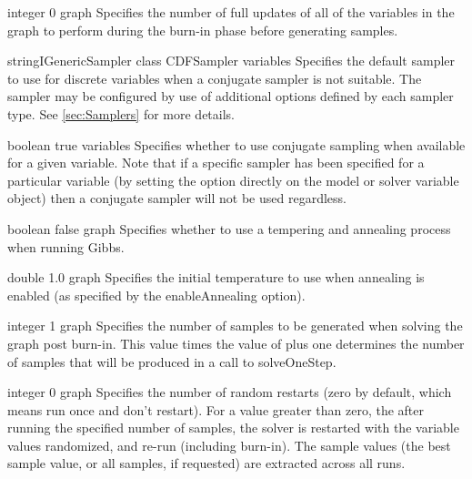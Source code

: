 
{integer}
{0}
{graph}
{Specifies the number of full updates of all of the variables in the graph to perform during the burn-in phase before generating samples.}


{\ifmatlab string\fi \ifjava IGenericSampler class\fi}
{CDFSampler}
{variables}
{Specifies the default sampler to use for discrete variables when a conjugate sampler is not  suitable. The sampler may be configured by use of additional options defined by each sampler type. See \autoref{sec:Samplers} for more details.}


{boolean}
{true}
{variables}
{Specifies whether to use conjugate sampling when available for a given variable. Note that if a specific sampler has been specified for a particular variable (by setting the  option directly on the model or solver variable object) then a conjugate sampler will not be used regardless.}


{boolean}
{false}
{graph}
{Specifies whether to use a tempering and annealing process when running Gibbs.}


{double}
{1.0}
{graph}
{Specifies the initial temperature to use when annealing is enabled (as specified by the enableAnnealing option).}


{integer}
{1}
{graph}
{Specifies the number of samples to be generated when solving the graph post burn-in. This value times the value of  plus one determines the number of samples that will be produced in a call to solveOneStep.}


{integer}
{0}
{graph}
{Specifies the number of random restarts (zero by default, which means run once and don't restart). For a value greater than zero, the after running the specified number of samples, the solver is restarted with the variable values randomized, and re-run (including burn-in).  The sample values (the best sample value, or all samples, if requested) are extracted across all runs.
}


